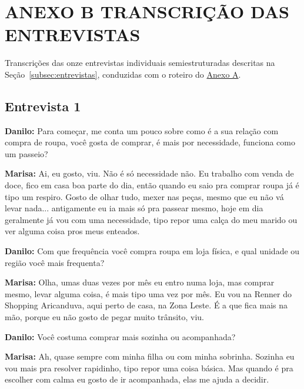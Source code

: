 
\section*{ANEXO B \textendash{} TRANSCRIÇÃO DAS ENTREVISTAS}
\label{anexo:entrevistas}

Transcrições das onze entrevistas individuais semiestruturadas descritas na Seção~\ref{subsec:entrevistas}, conduzidas com o roteiro do \hyperref[anexo:roteiro_entrevistas]{Anexo A}.

\subsection*{Entrevista 1}

\textbf{Danilo:} Para começar, me conta um pouco sobre como é a sua relação com compra de roupa, você gosta de comprar, é mais por necessidade, funciona como um passeio?

\textbf{Marisa:} Ai, eu gosto, viu. Não é só necessidade não. Eu trabalho com venda de doce, fico em casa boa parte do dia, então quando eu saio pra comprar roupa já é tipo um respiro. Gosto de olhar tudo, mexer nas peças, mesmo que eu não vá levar nada... antigamente eu ia mais só pra passear mesmo, hoje em dia geralmente já vou com uma necessidade, tipo repor uma calça do meu marido ou ver alguma coisa pros meus enteados.

\textbf{Danilo:} Com que frequência você compra roupa em loja física, e qual unidade ou região você mais frequenta?

\textbf{Marisa:} Olha, umas duas vezes por mês eu entro numa loja, mas comprar mesmo, levar alguma coisa, é mais tipo uma vez por mês. Eu vou na Renner do Shopping Aricanduva, aqui perto de casa, na Zona Leste. É a que fica mais na mão, porque eu não gosto de pegar muito trânsito, viu.

\textbf{Danilo:} Você costuma comprar mais sozinha ou acompanhada?

\textbf{Marisa:} Ah, quase sempre com minha filha ou com minha sobrinha. Sozinha eu vou mais pra resolver rapidinho, tipo repor uma coisa básica. Mas quando é pra escolher com calma eu gosto de ir acompanhada, elas me ajuda a decidir.

